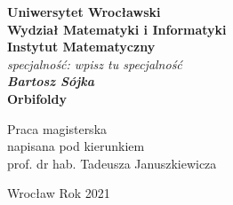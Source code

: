 \newpage
\thispagestyle{empty}
\begin{center}
\textbf{\large Uniwersytet Wrocławski\\
Wydział Matematyki i Informatyki\\
Instytut Matematyczny}\\
\textit{\large specjalność: wpisz tu specjalność}\\
\vspace{4cm}
\textbf{\textit{\large Bartosz Sójka}\\
\vspace{0.5cm}
{\Large Orbifoldy}}\\
\end{center}
\vspace{3cm}
{\large \hspace*{6.5cm}Praca magisterska\\
\hspace*{6.5cm}napisana pod kierunkiem\\
\hspace*{6.5cm} prof. dr hab. Tadeusza Januszkiewicza }\\
\vfill
\begin{center}
{\large Wrocław Rok 2021}\\
\end{center}
